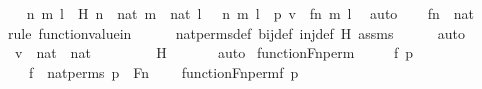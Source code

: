 \begin{isabellebody}
\ \isamarkupfalse%
\ n\ m\ l\ \ H{\isacharcolon}{\kern0pt}\ {\isachardoublequoteopen}n\ {\isasymin}\ nat{\isachardoublequoteclose}\ {\isachardoublequoteopen}m\ {\isasymin}\ nat{\isachardoublequoteclose}\ {\isachardoublequoteopen}l\ {\isasymin}\ {}{\isachardoublequoteclose}\ {\isachardoublequoteopen}{\isacharless}{\kern0pt}{\isacharless}{\kern0pt}n{\isacharcomma}{\kern0pt}\ m{\isachargreater}{\kern0pt}{\isacharcomma}{\kern0pt}\ l{\isachargreater}{\kern0pt}\ {\isasymin}\ p{\isachardoublequoteclose}\ {\isachardoublequoteopen}v\ {\isacharequal}{\kern0pt}\ {\isacharless}{\kern0pt}{\isacharless}{\kern0pt}f{\isacharbackquote}{\kern0pt}n{\isacharcomma}{\kern0pt}\ m{\isachargreater}{\kern0pt}{\isacharcomma}{\kern0pt}\ l{\isachargreater}{\kern0pt}{\isachardoublequoteclose}\ \isamarkupfalse%
\ auto\isanewline
\ \ \isamarkupfalse%
\ {\isachardoublequoteopen}f{\isacharbackquote}{\kern0pt}n\ {\isasymin}\ nat{\isachardoublequoteclose}\isanewline
\ \ \ \ \isamarkupfalse%
{\isacharparenleft}{\kern0pt}rule\ function{\isacharunderscore}{\kern0pt}value{\isacharunderscore}{\kern0pt}in{\isacharparenright}{\kern0pt}\isanewline
\ \ \ \ \isamarkupfalse%
\ nat{\isacharunderscore}{\kern0pt}perms{\isacharunderscore}{\kern0pt}def\ bij{\isacharunderscore}{\kern0pt}def\ inj{\isacharunderscore}{\kern0pt}def\ H\ assms\isanewline
\ \ \ \ \isamarkupfalse%
\ auto\isanewline
\ \ \isamarkupfalse%
\ \isamarkupfalse%
\ {\isachardoublequoteopen}v\ {\isasymin}\ {\isacharparenleft}{\kern0pt}nat\ {\isasymtimes}\ nat{\isacharparenright}{\kern0pt}\ {\isasymtimes}\ {}{\isachardoublequoteclose}\ \isanewline
\ \ \ \ \isamarkupfalse%
\ H\ \isanewline
\ \ \ \ \isamarkupfalse%
\ auto\isanewline
{}\isamarkupfalse%
%
\endisatagproof
{\isafoldproof}%
%
\isadelimproof
\isanewline
%
\endisadelimproof
\isanewline
{}\isamarkupfalse%
\ function{\isacharunderscore}{\kern0pt}Fn{\isacharunderscore}{\kern0pt}perm\ {\isacharcolon}{\kern0pt}\ \isanewline
\ \ \ f\ p\ \isanewline
\ \ \ {\isachardoublequoteopen}f\ {\isasymin}\ nat{\isacharunderscore}{\kern0pt}perms{\isachardoublequoteclose}\ {\isachardoublequoteopen}p\ {\isasymin}\ Fn{\isachardoublequoteclose}\ \isanewline
\ \ \ {\isachardoublequoteopen}function{\isacharparenleft}{\kern0pt}Fn{\isacharunderscore}{\kern0pt}perm{\isacharparenleft}{\kern0pt}f{\isacharcomma}{\kern0pt}\ p{\isacharparenright}{\kern0pt}{\isacharparenright}{\kern0pt}{\isachardoublequoteclose}\isanewline

\end{isabellebody}

